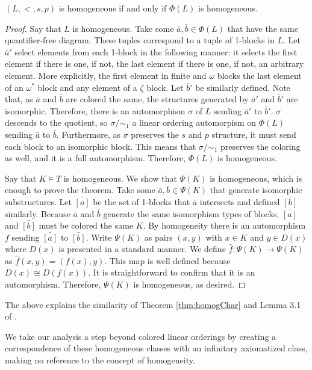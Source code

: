 \documentclass[11pt]{amsart}
\theoremstyle{definition}
\begin{document}
\begin{proposition}
$(L,<,s,p)$ is homogeneous if and only if $\Phi(L)$ is homogeneous.
\end{proposition}

\begin{proof}
Say that $L$ is homogeneous.
Take some $\bar{a},\bar{b}\in \Phi(L)$ that have the same quantifier-free diagram.
These tuples correspond to a tuple of 1-blocks in $L$.
Let $\bar{a}'$ select elements from each 1-block in the following manner: it selects the first element if there is one, if not, the last element if there is one, if not, an arbitrary element.
More explicitly, the first element in finite and $\omega$ blocks the last element of an $\omega^*$ block and any element of a $\zeta$ block.
Let $\bar{b}'$ be similarly defined.
Note that, as $\bar{a}$ and $\bar{b}$ are colored the same, the structures generated by $\bar{a}'$ and $\bar{b}'$ are isomorphic.
Therefore, there is an automorphism $\sigma$ of $L$ sending $\bar{a}'$ to $\bar{b}'$.
$\sigma$ descends to the quotient, so $\sigma/\sim_1$ a linear ordering automorpism on $\Phi(L)$ sending $\bar{a}$ to $\bar{b}$.
Furthermore, as $\sigma$ preserves the $s$ and $p$ structure, it must send each block to an isomorphic block.
This means that $\sigma/\sim_1$ preserves the coloring as well, and it is a full automorphism.
Therefore, $\Phi(L)$ is homogeneous.

Say that $K\models T$ is homogeneous.
We show that $\Psi(K)$ is homogeneous, which is enough to prove the theorem.
Take some $\bar{a},\bar{b}\in \Psi(K)$ that generate isomorphic substructures.
Let $\bar{[a]}$ be the set of 1-blocks that $\bar{a}$ intersects and defined $\bar{[b]}$ similarly.
Because $\bar{a}$ and $\bar{b}$ generate the same isomorphism types of blocks, $\bar{[a]}$ and $\bar{[b]}$ must be colored the same $K$.
By homogeneity there is an automorphism $f$ sending $\bar{[a]}$ to $\bar{[b]}$.
Write $\Psi(K)$ as pairs $(x,y)$ with $x\in K$ and $y\in D(x)$ where $D(x)$ is presented in a standard manner.
We define $\hat{f}: \Psi(K)\to\Psi(K)$ as $\hat{f}(x,y)=(f(x),y)$.
This map is well defined because $D(x)\cong D(f(x))$.
It is straightforward to confirm that it is an automorphism.
Therefore, $\Psi(K)$ is homogeneous, as desired.

\end{proof}

The above explains the similarity of Theorem \ref{thm:homogChar} and Lemma 3.1 of \cite{ST08}.

We take our analysis a step beyond colored linear orderings by creating a correspondence of these homogeneous classes with an infinitary axiomatized class, making no reference to the concept of homogeneity.
\end{document}
